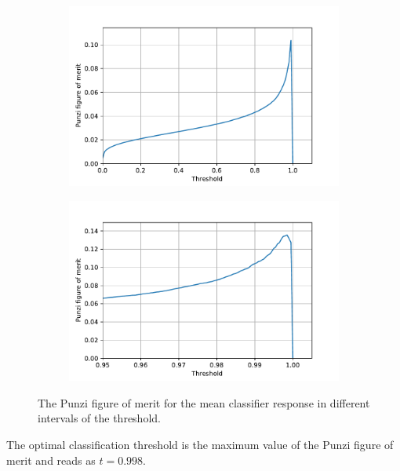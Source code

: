 \begin{figure}
  \centering
  \begin{subfigure}[b]{0.45\textwidth}
    \centering
    \includegraphics[width=\textwidth]{"content/plots/pfom_full.pdf"}
  \end{subfigure}
  \hfill
  \begin{subfigure}[b]{0.45\textwidth}
    \centering
    \includegraphics[width=\textwidth]{"content/plots/pfom_zoom.pdf"}
  \end{subfigure}
  \caption{The Punzi figure of merit for the mean classifier response in different intervals of the threshold.}
  \label{fig:pFOM}
\end{figure}
The optimal classification threshold is the maximum value of the Punzi figure of merit and reads as $t = 0.998$.


